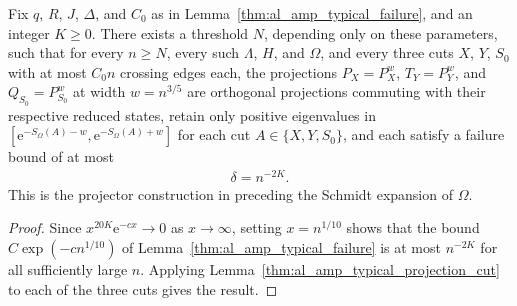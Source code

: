 \begin{lemma}
    \label{thm:al_amp_typical_projectors}
    \leanok
    Fix $q$, $R$, $J$, $\Delta$, and $C_0$ as in
    Lemma~\ref{thm:al_amp_typical_failure}, and an integer $K\ge0$.
    There exists a threshold $N$, depending only on these parameters, such
    that for every $n\ge N$, every such $\Lambda$, $H$, and $\Omega$, and
    every three cuts $X$, $Y$, $S_0$ with at most $C_0n$ crossing edges
    each, the projections $P_X=P_X^w$, $T_Y=P_Y^w$, and $Q_{S_0}=P_{S_0}^w$
    at width $w=n^{3/5}$ are orthogonal projections commuting with their
    respective reduced states, retain only positive eigenvalues in
    $[\mathrm e^{-S_\Omega(A)-w},\mathrm e^{-S_\Omega(A)+w}]$ for each cut
    $A\in\{X,Y,S_0\}$, and each satisfy a failure bound of at most
    \begin{align*}
        \delta=n^{-2K}.
    \end{align*}
    This is the projector construction in \cite[Section~10]{OpenAI2026AreaLaw}
    preceding the Schmidt expansion of $\Omega$.
\end{lemma}
\begin{proof}\leanok
    Since $x^{20K}\mathrm e^{-cx}\to0$ as $x\to\infty$, setting $x=n^{1/10}$
    shows that the bound $C\exp(-cn^{1/10})$ of
    Lemma~\ref{thm:al_amp_typical_failure} is at most $n^{-2K}$ for all
    sufficiently large $n$. Applying
    Lemma~\ref{thm:al_amp_typical_projection_cut} to each of the three cuts
    gives the result.
\end{proof}


